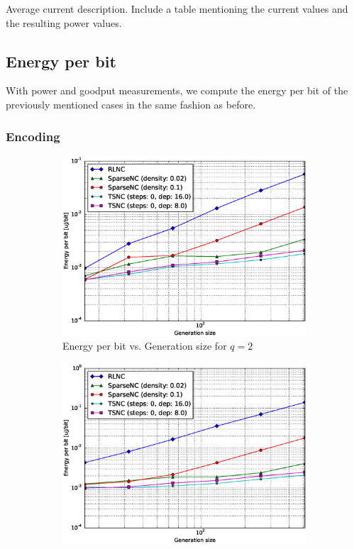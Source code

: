 Average current description. Include a table mentioning the current values
and the resulting power values.

\subsection{Energy per bit}
With power and goodput measurements, we compute the energy per bit of
the previously mentioned cases in the same fashion as before.

\subsubsection{Encoding}

\begin{figure}
    \centering
    \begin{subfigure}[b]{0.475\textwidth}
        \centering
        \includegraphics[width=1.1\textwidth]{images/23_07_2015/energy_per_bit_vs_generation_size_Rasp_Binary_encoder_1600.eps}
        \caption[]%
        {{\small Energy per bit vs. Generation size for $q = 2$}}
        \label{fig:enc_ene_rasp1_gen_gf2}
    \end{subfigure}
    \hfill
    \begin{subfigure}[b]{0.475\textwidth}
        \centering
        \includegraphics[width=1.1\textwidth]{images/23_07_2015/energy_per_bit_vs_generation_size_Rasp_Binary8_encoder_1600.eps}

\end{subfigure}
\end{figure}

